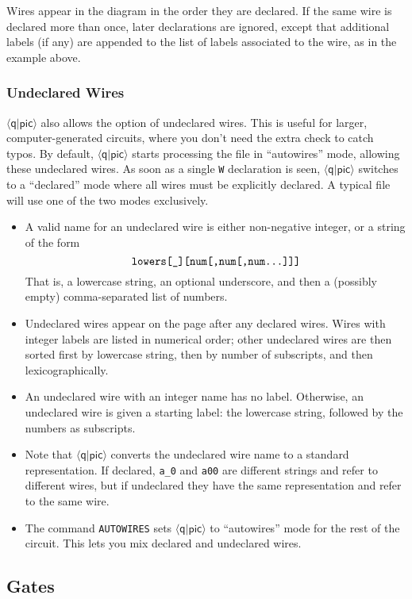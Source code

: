 \documentclass[twoside,12pt]{article}
\newcommand{\qpic}{$\langle\mathsf{q}|\mathsf{pic}\rangle$\xspace}
\begin{document}
Wires appear in the diagram in the order they are declared.  If the same wire is declared
more than once, later declarations are ignored, except that additional labels (if any)
are appended to the list of labels associated to the wire, as in the example above.

\subsubsection{Undeclared Wires}

\qpic also allows the option of undeclared wires.  This is useful for larger,
computer-generated circuits, where you don't need the extra check to catch
typos.  By default, \qpic starts processing the file in ``autowires'' mode, allowing
these undeclared wires.  As soon as a single {\tt W} declaration is seen, \qpic
switches to a ``declared'' mode where all wires must be explicitly declared.
A typical file will use one of the two modes exclusively.

\begin{itemize}
\item A valid name for an undeclared wire is either non-negative integer,
  or a string of the form
  $$
  \text{\tt lowers[\_][num[,num[,num...]]]}
  $$
  That is, a lowercase string, an optional underscore, and then a (possibly empty)
  comma-separated list of numbers.
\item Undeclared wires appear on the page after any declared wires.  Wires with integer
  labels are listed in numerical order; other undeclared wires are then sorted first by
  lowercase string, then by number of subscripts, and then lexicographically.
\item An undeclared wire with an integer name has no label.
  Otherwise, an undeclared wire is given a starting label: the
  lowercase string, followed by the numbers as subscripts.
\item Note that \qpic converts the undeclared wire name to a standard representation.  If
  declared, {\tt a\_0} and {\tt a00} are different strings and refer to different wires,
  but if undeclared they have the same representation and refer to the same wire.
\item The command {\tt AUTOWIRES} sets \qpic to ``autowires'' mode for the rest
  of the circuit.  This lets you mix declared and undeclared wires.
\end{itemize}

\subsection{Gates}
\end{document}
